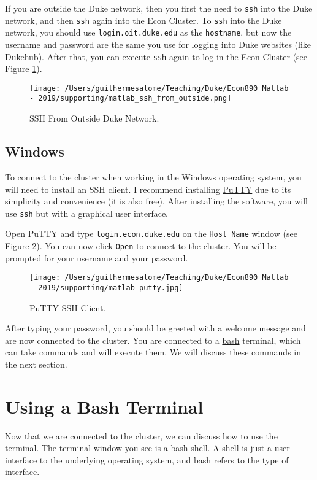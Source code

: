 \documentclass[12pt, a4paper]{article}
\begin{document}
If you are outside the Duke network, then you first the need to \texttt{ssh} into the Duke network, and then \texttt{ssh} again into the Econ Cluster.
To \texttt{ssh} into the Duke network, you should use \texttt{login.oit.duke.edu} as the \texttt{hostname}, but now the username and password are the same you use for logging into Duke websites (like Dukehub).
After that, you can execute \texttt{ssh} again to log in the Econ Cluster (see Figure \ref{fig:orge73a9c7}).

\begin{figure}[H]
\centering
\texttt{[image: /Users/guilhermesalome/Teaching/Duke/Econ890 Matlab - 2019/supporting/matlab\_ssh\_from\_outside.png]}
\caption{\label{fig:orge73a9c7}
SSH From Outside Duke Network.}
\end{figure}
\subsection{Windows}
\label{sec:orga69e4ce}
To connect to the cluster when working in the Windows operating system, you will need to install an SSH client.
I recommend installing \href{https://www.chiark.greenend.org.uk/\~sgtatham/putty/}{PuTTY} due to its simplicity and convenience (it is also free).
After installing the software, you will use \texttt{ssh} but with a graphical user interface.

Open PuTTY and type \texttt{login.econ.duke.edu} on the \texttt{Host Name} window (see Figure \ref{fig:org2daae6c}).
You can now click \texttt{Open} to connect to the cluster.
You will be prompted for your username and your password.

\begin{figure}[H]
\centering
\texttt{[image: /Users/guilhermesalome/Teaching/Duke/Econ890 Matlab - 2019/supporting/matlab\_putty.jpg]}
\caption{\label{fig:org2daae6c}
PuTTY SSH Client.}
\end{figure}

After typing your password, you should be greeted with a welcome message and are now connected to the cluster.
You are connected to a \href{https://en.wikipedia.org/wiki/Bash\_(Unix\_shell)}{bash} terminal, which can take commands and will execute them.
We will discuss these commands in the next section.

\section{Using a Bash Terminal}
\label{sec:orgd81750d}
Now that we are connected to the cluster, we can discuss how to use the terminal.
The terminal window you see is a bash shell.
A shell is just a user interface to the underlying operating system, and bash refers to the type of interface.
\end{document}
